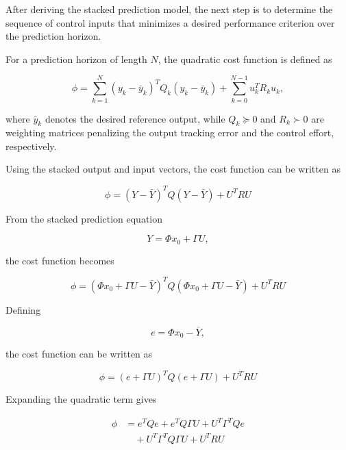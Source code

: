 After deriving the stacked prediction model, the next step is to determine the sequence of control inputs that minimizes a desired performance criterion over the prediction horizon.

For a prediction horizon of length \(N\), the quadratic cost function is defined as

\begin{equation}
    \phi =
    \sum_{k=1}^{N}
    (y_k-\bar{y}_k)^{T}
    Q_k
    (y_k-\bar{y}_k)
    +
    \sum_{k=0}^{N-1}
    u_k^{T} R_k u_k,
    \label{eq:lti_cost_scalar}
\end{equation}

where \(\bar{y}_k\) denotes the desired reference output, while
\(Q_k \succeq 0\) and \(R_k \succ 0\) are weighting matrices penalizing the output tracking error and the control effort, respectively.

Using the stacked output and input vectors, the cost function can be written as

\begin{equation}
    \phi =
    (Y-\bar{Y})^{T}
    Q
    (Y-\bar{Y})
    +
    U^{T} R U
    \label{eq:lti_cost_stacked}
\end{equation}

From the stacked prediction equation

\begin{equation}
    Y = \Phi x_0 + \Gamma U,
\end{equation}

the cost function becomes

\begin{equation}
    \phi =
    (\Phi x_0 + \Gamma U-\bar{Y})^T
    Q
    (\Phi x_0 + \Gamma U-\bar{Y})
    +
    U^T R U
    \label{eq:lti_cost_substituted}
\end{equation}

Defining

\begin{equation}
    e = \Phi x_0-\bar{Y},
\end{equation}

the cost function can be written as

\begin{equation}
    \phi =
    (e+\Gamma U)^TQ(e+\Gamma U)
    +
    U^TRU
\end{equation}

Expanding the quadratic term gives

\begin{align}
    \phi
    &=
    e^TQe
    +
    e^TQ\Gamma U
    +
    U^T\Gamma^TQe \nonumber\\
    &\quad+
    U^T\Gamma^TQ\Gamma U
    +
    U^TRU
\end{align}

